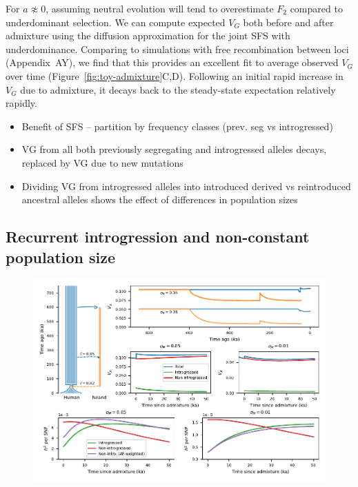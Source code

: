 \documentclass{article}
\begin{document}
For $a \not\approx 0$, assuming neutral evolution will tend to overestimate
$F_2$ compared to underdominant selection. We can compute expected $V_G$ both
before and after admixture using the diffusion approximation for the joint SFS
with underdominance. Comparing to simulations with free recombination between
loci (Appendix~AY), we find that this provides an excellent fit to average
observed $V_G$ over time (Figure~\ref{fig:toy-admixture}C,D). Following an
initial rapid increase in $V_G$ due to admixture, it decays back to the
steady-state expectation relatively rapidly.

\begin{itemize}
    \item Benefit of SFS -- partition by frequency classes (prev. seg vs introgressed)
    \item VG from all both previously segregating and introgressed alleles decays,
        replaced by VG due to new mutations
    \item Dividing VG from introgressed alleles into introduced derived vs reintroduced
        ancestral alleles shows the effect of differences in population sizes
\end{itemize}

\subsection*{Recurrent introgression and non-constant population size}

\begin{figure}[t!]
    \centering
    \includegraphics{../figures/neanderthal_admixture.pdf}
    \caption{
        \textbf{}
    }
    \label{fig:neand-to-human}
\end{figure}
\end{document}
